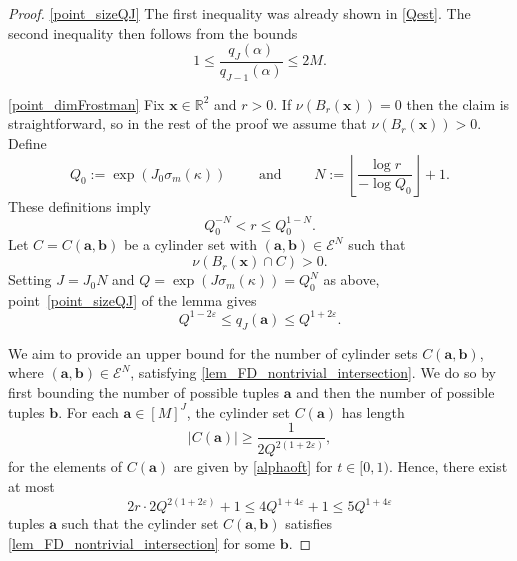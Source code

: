 \documentclass[12pt, reqno]{amsart}
\theoremstyle{definition}
\theoremstyle{remark}
\numberwithin{equation}{section}
\def\alp{{\alpha}} \def\bfalp{{\boldsymbol \alpha}}
\def\kap{{\kappa}}
\def\sig{{\sigma}} \def\Sig{{\Sigma}} \def\bfsig{{\boldsymbol \sig}}
\def\eps{\varepsilon}
\def\le{\leqslant} \def\ge{\geqslant}
\def\ls{\leqslant} \def\gs{\geqslant}
\def \sig{{\sigma}}
\def \bR {\mathbb R}
\def \ba {\mathbf a}
\def \bb {\mathbf b}
\def \bx {\mathbf x}
\def \cE {\mathcal E}
\begin{document}
\begin{proof}
\eqref{point_sizeQJ} The first inequality was already shown in \eqref{Qest}. The second inequality then follows from the bounds
\[
1 \le
\frac{q_J(\alp)}{q_{J-1}(\alp)} \le 2M.
\]

\eqref{point_dimFrostman}  Fix $\bx\in\bR^2$ and $r>0.$ If $\nu(B_r(\bx))=0$ then the claim is straightforward, so in the rest of the proof we assume that $\nu(B_r(\bx))>0$. Define
\begin{equation} \label{def_Q0_N}
Q_0:=\exp(J_0 \sigma_m(\kappa)) \qquad \text{ and  } \qquad N:=\left\lfloor\frac{\log r}{-\log Q_0}\right\rfloor+1.
\end{equation}
These definitions imply  
\begin{equation} \label{r_level}
Q_0^{-N} < r \le Q_0^{1-N}.
\end{equation}
Let $C=C(\ba,\bb)$ be a cylinder set with $(\ba,\bb)\in\cE^N$  such that
\begin{equation} \label{lem_FD_nontrivial_intersection}
\nu\left(B_r(\bx)\cap C\right)>0.
\end{equation}
Setting  $J=J_0 N$ and $Q=\exp(J\sig_m(\kap))=Q_0^N$ as above, point~\eqref{point_sizeQJ} of the lemma gives
\begin{equation} \label{lem_FD_size_q}
Q^{1-2\varepsilon}
\le q_{J}(\ba)\le Q^{1+2\varepsilon}.
\end{equation}

We aim to provide an upper bound for the number of cylinder sets $C(\ba,\bb)$, where $(\ba,\bb) \in \cE^N$, satisfying \eqref{lem_FD_nontrivial_intersection}. We do so by first bounding the number of possible tuples $\ba$ and then the number of possible tuples $\bb$. For each $\ba\in [M]^{J}$, the cylinder set $C(\ba)$ has length 
\[
|C(\ba)| \gs \frac1{2Q^{2(1+2\eps)}},
\]
for the elements of $C(\ba)$ are given by \eqref{alphaoft} for $t \in [0,1)$.
Hence, there exist at most
\begin{equation} \label{lem_FD_ub_cylinders_a}
2r\cdot 2Q^{2(1+2\varepsilon)}+1 \ls 4Q^{1+4\varepsilon} +1 \ls 5Q^{1+4\varepsilon}
\end{equation}
tuples $\ba$ such that the cylinder set $C(\ba,\bb)$ satisfies \eqref{lem_FD_nontrivial_intersection} for some $\bb$.


\end{proof}
\end{document}

